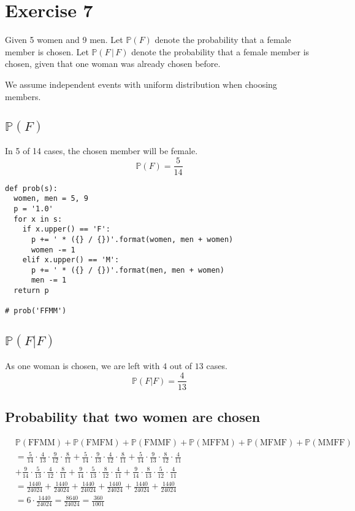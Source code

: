\documentclass{article}
\begin{document}
\section{Exercise 7}

Given 5 women and 9 men.
Let $\mathbb P(F)$ denote the probability that a female member is chosen.
Let $\mathbb P(F\,|\,F)$ denote the probability that a female member is chosen, given that one woman was already chosen before.

We assume independent events with uniform distribution when choosing members.

\subsection{$\mathbb P(F)$}
%
In 5 of 14 cases, the chosen member will be female.
\[ \mathbb P(F) = \frac{5}{14} \]

\begin{verbatim}
def prob(s):
  women, men = 5, 9
  p = '1.0'
  for x in s:
    if x.upper() == 'F':
      p += ' * ({} / {})'.format(women, men + women)
      women -= 1
    elif x.upper() == 'M':
      p += ' * ({} / {})'.format(men, men + women)
      men -= 1
  return p

# prob('FFMM')
\end{verbatim}

\subsection{$\mathbb P(F|F)$}
%
As one woman is chosen, we are left with $4$ out of $13$ cases.
\[ \mathbb P(F|F) = \frac{4}{13} \]

\subsection{Probability that two women are chosen}
%
\begin{align*}
  &\mathbb P(\text{FFMM}) + \mathbb P(\text{FMFM}) + \mathbb P(\text{FMMF}) + \mathbb P(\text{MFFM}) + \mathbb P(\text{MFMF}) + \mathbb P(\text{MMFF}) \\
  &= \frac{5}{14} \cdot \frac{4}{13} \cdot \frac{9}{12} \cdot \frac{8}{11}
  + \frac{5}{14} \cdot \frac{9}{13} \cdot \frac{4}{12} \cdot \frac{8}{11}
  + \frac{5}{14} \cdot \frac{9}{13} \cdot \frac{8}{12} \cdot \frac{4}{11} \\
  &+ \frac{9}{14} \cdot \frac{5}{13} \cdot \frac{4}{12} \cdot \frac{8}{11}
  + \frac{9}{14} \cdot \frac{5}{13} \cdot \frac{8}{12} \cdot \frac{4}{11}
  + \frac{9}{14} \cdot \frac{8}{13} \cdot \frac{5}{12} \cdot \frac{4}{11} \\
  &= \frac{1440}{24024} + \frac{1440}{24024} + \frac{1440}{24024} + \frac{1440}{24024} + \frac{1440}{24024} + \frac{1440}{24024} \\
  &= 6 \cdot \frac{1440}{24024} = \frac{8640}{24024} = \frac{360}{1001}
\end{align*}
\end{document}
